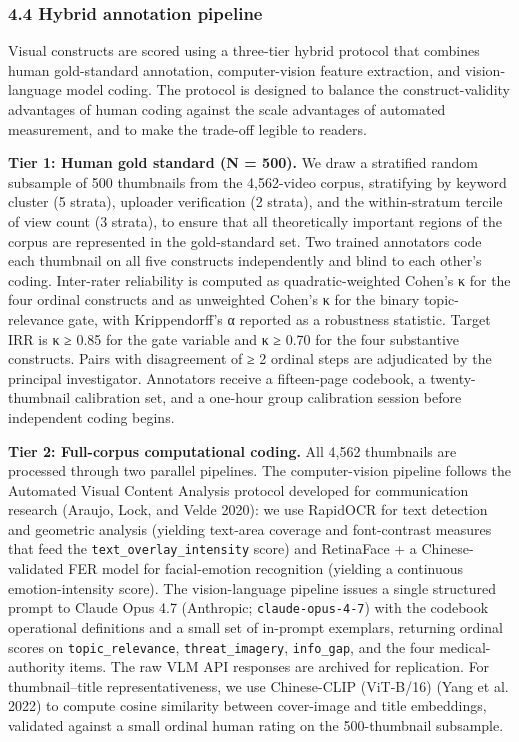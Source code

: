 \documentclass[
  12pt,
]{article}
\begin{document}
\subsubsection{4.4 Hybrid annotation
pipeline}\label{hybrid-annotation-pipeline}

Visual constructs are scored using a three-tier hybrid protocol that
combines human gold-standard annotation, computer-vision feature
extraction, and vision-language model coding. The protocol is designed
to balance the construct-validity advantages of human coding against the
scale advantages of automated measurement, and to make the trade-off
legible to readers.

\textbf{Tier 1: Human gold standard (N = 500).} We draw a stratified
random subsample of 500 thumbnails from the 4,562-video corpus,
stratifying by keyword cluster (5 strata), uploader verification (2
strata), and the within-stratum tercile of view count (3 strata), to
ensure that all theoretically important regions of the corpus are
represented in the gold-standard set. Two trained annotators code each
thumbnail on all five constructs independently and blind to each other's
coding. Inter-rater reliability is computed as quadratic-weighted
Cohen's κ for the four ordinal constructs and as unweighted Cohen's κ
for the binary topic-relevance gate, with Krippendorff's α reported as a
robustness statistic. Target IRR is κ ≥ 0.85 for the gate variable and κ
≥ 0.70 for the four substantive constructs. Pairs with disagreement of ≥
2 ordinal steps are adjudicated by the principal investigator.
Annotators receive a fifteen-page codebook, a twenty-thumbnail
calibration set, and a one-hour group calibration session before
independent coding begins.

\textbf{Tier 2: Full-corpus computational coding.} All 4,562 thumbnails
are processed through two parallel pipelines. The computer-vision
pipeline follows the Automated Visual Content Analysis protocol
developed for communication research (Araujo, Lock, and Velde 2020): we
use RapidOCR for text detection and geometric analysis (yielding
text-area coverage and font-contrast measures that feed the
\texttt{text\_overlay\_intensity} score) and RetinaFace + a
Chinese-validated FER model for facial-emotion recognition (yielding a
continuous emotion-intensity score). The vision-language pipeline issues
a single structured prompt to Claude Opus 4.7 (Anthropic;
\texttt{claude-opus-4-7}) with the codebook operational definitions and
a small set of in-prompt exemplars, returning ordinal scores on
\texttt{topic\_relevance}, \texttt{threat\_imagery}, \texttt{info\_gap},
and the four medical-authority items. The raw VLM API responses are
archived for replication. For thumbnail--title representativeness, we
use Chinese-CLIP (ViT-B/16) (Yang et al. 2022) to compute cosine
similarity between cover-image and title embeddings, validated against a
small ordinal human rating on the 500-thumbnail subsample.
\end{document}
